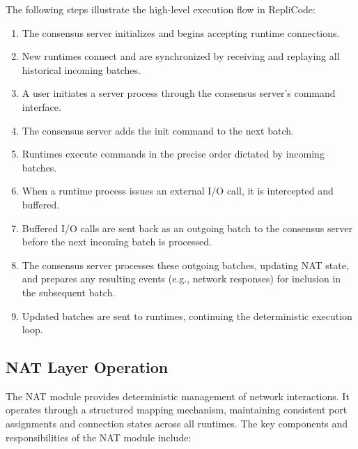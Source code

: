 \documentclass[10pt]{IEEEtran}
\begin{document}
The following steps illustrate the high-level execution flow in RepliCode:

\begin{enumerate}
\item The consensus server initializes and begins accepting runtime connections.
\item New runtimes connect and are synchronized by receiving and replaying all historical incoming batches.
\item A user initiates a server process through the consensus server's command interface.
\item The consensus server adds the init command to the next batch.
\item Runtimes execute commands in the precise order dictated by incoming batches.
\item When a runtime process issues an external I/O call, it is intercepted and buffered.
\item Buffered I/O calls are sent back as an outgoing batch to the consensus server before the next incoming batch is processed.
\item The consensus server processes these outgoing batches, updating NAT state, and prepares any resulting events (e.g., network responses) for inclusion in the subsequent batch.
\item Updated batches are sent to runtimes, continuing the deterministic execution loop.
\end{enumerate}


\subsection{NAT Layer Operation}

The NAT module provides deterministic management of network interactions. It operates through a structured mapping mechanism, maintaining consistent port assignments and connection states across all runtimes. The key components and responsibilities of the NAT module include:
\end{document}

